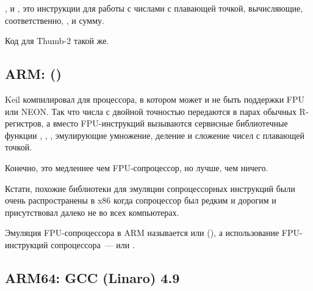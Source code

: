 ,  и , это инструкции для работы с числами 
с плавающей точкой, вычисляющие, соответственно, ,  и сумму.

Код для Thumb-2 такой же.

\subsection{ARM: \OptimizingKeilVI (\ThumbMode)}



Keil компилировал для процессора, в котором может и не быть поддержки FPU или NEON.
Так что числа с двойной точностью передаются в парах обычных R-регистров,
а вместо FPU-инструкций вызываются сервисные библиотечные функции
, , , эмулирующие умножение, деление и сложение чисел с плавающей точкой.

Конечно, это медленнее чем FPU-сопроцессор, но лучше, чем ничего.

Кстати, похожие библиотеки для эмуляции сопроцессорных инструкций были очень распространены в x86 
когда сопроцессор был редким и дорогим и присутствовал далеко не во всех компьютерах.

Эмуляция FPU-сопроцессора в ARM называется  или  (),
а использование FPU-инструкций сопроцессора~---  или .

\iffalse
\myindex{Raspberry Pi}
Ядро Linux, например, для Raspberry Pi может поставляться в двух вариантах.

В случае \IT{soft float}, аргументы будут передаваться через R-регистры, 
а в случае \IT{hard float}, через D-регистры.


И это то, что помешает использовать, например, armhf-библиотеки
из armel-кода или наоборот, поэтому, весь код в дистрибутиве Linux должен быть скомпилирован
в соответствии с выбранным соглашением о вызовах.

\fi

\subsection{ARM64: \Optimizing GCC (Linaro) 4.9}

